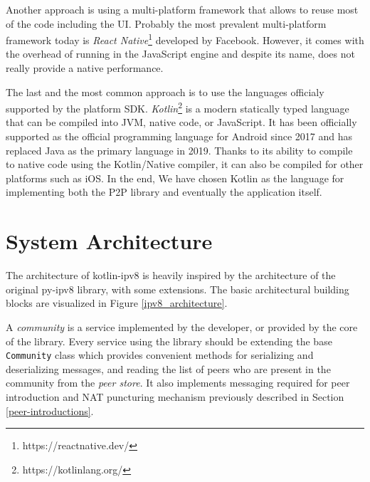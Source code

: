 Another approach is using a multi-platform framework that allows to reuse most of the code including the UI. Probably the most prevalent multi-platform framework today is \textit{React Native}\footnote{https://reactnative.dev/} developed by Facebook. However, it comes with the overhead of running in the JavaScript engine and despite its name, does not really provide a native performance.

The last and the most common approach is to use the languages officialy supported by the platform SDK. \textit{Kotlin}\footnote{https://kotlinlang.org/} is a modern statically typed language that can be compiled into JVM, native code, or JavaScript. It has been officially supported as the official programming language for Android since 2017 \cite{androidkotlin} and has replaced Java as the primary language in 2019. Thanks to its ability to compile to native code using the Kotlin/Native compiler, it can also be compiled for other platforms such as iOS. In the end, We have chosen Kotlin as the language for implementing both the P2P library and eventually the application itself.



\section{System Architecture}

The architecture of kotlin-ipv8 is heavily inspired by the architecture of the original py-ipv8 library, with some extensions. %
The basic architectural building blocks are visualized in Figure \ref{ipv8_architecture}.

A \textit{community} is a service implemented by the developer, or provided by the core of the library. Every service using the library should be extending the base \texttt{Community} class which provides convenient methods for serializing and deserializing messages, and reading the list of peers who are present in the community from the \textit{peer store}. It also implements messaging required for peer introduction and NAT puncturing mechanism previously described in Section \ref{peer-introductions}.

